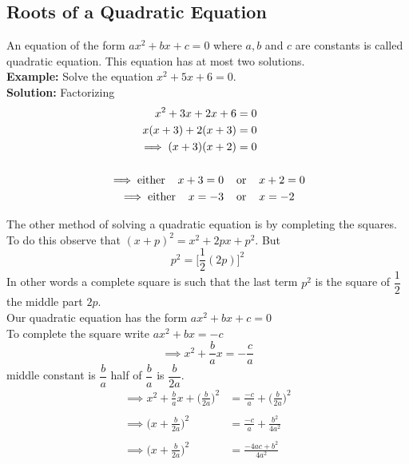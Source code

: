 \documentclass[11pt,a4paper]{article}
\begin{document}
\subsection{Roots of a Quadratic Equation }

An equation of the form $ax^2+bx+c=0$ where $a, b$ and $c$ are constants is called quadratic equation. This equation has at most two solutions.\\

\textbf{Example:} Solve the equation $x^2+5x+6=0$.\\

\textbf{Solution:} Factorizing
\begin{align*}
x^2+3x+2x+6 & = 0\\
x(x+3)+2(x+3) & =0\\
\implies (x+3)(x+2) & = 0\\\\
\implies \text{either}\hspace{0.4cm} x+3=0\hspace{0.4cm} &\text{or}\hspace{0.4cm} x+2=0\\
\implies \text{either}\hspace{0.4cm} x=-3\hspace{0.4cm} & \text{or}\hspace{0.4cm} x=-2\\
\end{align*}



The other method of solving a quadratic equation is by completing the squares. To do this observe that \hspace{0.2cm}$(x+p)^2=x^2+2px+p^2$.\hspace{0.2cm} But $$p^2=\bigg[\frac{1}{2}(2p)\bigg]^2$$
In other words a complete square is such that the last term $p^2$ is the square of $\dfrac{1}{2}$ the middle part $2p$.\\

Our quadratic equation has the form \hspace{0.2cm}$ax^2+bx+c=0$\\

To complete the square write \hspace{0.2cm}$ax^2+bx=-c$
$$\implies x^2+\frac{b}{a}x=-\frac{c}{a}$$
middle constant is $\dfrac{b}{a}$ half of $\dfrac{b}{a}$ is $\dfrac{b}{2a}$.
\begin{align*}
\implies x^2+\frac{b}{a}x+\bigg(\frac{b}{2a}\bigg)^2 & =\frac{-c}{a}+\bigg(\frac{b}{2a}\bigg)^2\\\\
\implies \bigg(x+\frac{b}{2a}\bigg)^2 & = \frac{-c}{a}+\frac{b^2}{4a^2}\\\\
\implies \bigg(x+\frac{b}{2a}\bigg)^2 & =\frac{-4ac+b^2}{4a^2}
\end{align*}
\end{document}
